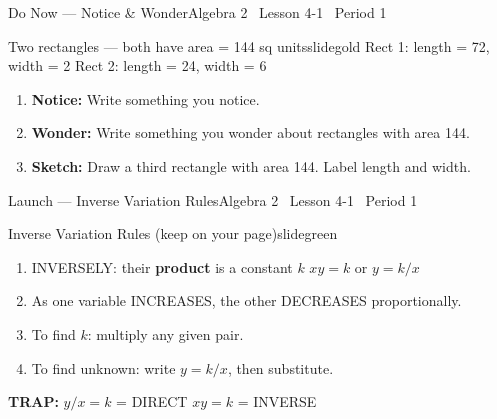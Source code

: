 \documentclass[aspectratio=169, 14pt]{beamer}
\begin{document}

\begin{frame}{Do Now --- Notice \& Wonder}{Algebra 2 \textperiodcentered\ Lesson 4-1 \textperiodcentered\ Period 1}
\vspace{0.1cm}
\begin{projcard}{Two rectangles --- both have area = 144 sq units}{slidegold}
\small
Rect 1: length = 72, width = 2 \hspace{2em} Rect 2: length = 24, width = 6

\vspace{0.15cm}
\begin{enumerate}
  \setlength{\itemsep}{1pt}
  \item \textbf{Notice:} Write something you notice.
  \item \textbf{Wonder:} Write something you wonder about rectangles with area 144.
  \item \textbf{Sketch:} Draw a third rectangle with area 144. Label length and width.
\end{enumerate}
\end{projcard}
\end{frame}

\begin{frame}{Launch --- Inverse Variation Rules}{Algebra 2 \textperiodcentered\ Lesson 4-1 \textperiodcentered\ Period 1}
\vspace{0.1cm}
\begin{projcard}{Inverse Variation Rules (keep on your page)}{slidegreen}
\small
\begin{enumerate}
  \setlength{\itemsep}{1pt}
  \item INVERSELY: their \textbf{product} is a constant \(k\) \hspace{1em} \(xy = k\) \hspace{0.5em} or \hspace{0.5em} \(y = k/x\)
  \item As one variable INCREASES, the other DECREASES proportionally.
  \item To find \(k\): multiply any given pair.
  \item To find unknown: write \(y = k/x\), then substitute.
\end{enumerate}
\vspace{0.1cm}
\textcolor{slideaccent}{\textbf{TRAP:}} \(y/x = k\) = DIRECT \hspace{2em} \(xy = k\) = INVERSE
\end{projcard}
\end{frame}
\end{document}
